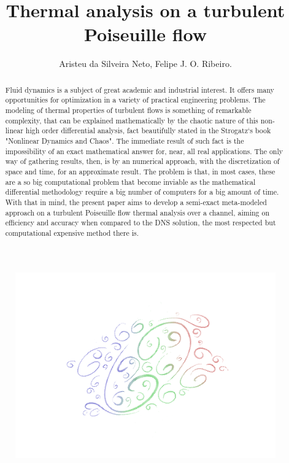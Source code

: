 \documentclass[10pt]{article} %
\title{ \loll Thermal analysis on a turbulent Poiseuille flow}
\author{Aristeu da Silveira Neto,  Felipe J. O. Ribeiro.}
\begin{document}
\maketitle

\begin{figure}[h!]
	\centering
	\includegraphics[angle=0, trim={0 1cm 0 1cm},scale=0.70]{turbulence}
	\label{turbulence}
\end{figure}

\begin{abstract}
	\noindent Fluid dynamics is a subject of great academic and industrial interest. It offers many opportunities for optimization in a variety of practical engineering problems. The modeling of thermal properties of turbulent flows is something of remarkable complexity, that can be explained mathematically by the chaotic nature of this non-linear high order differential analysis, fact beautifully stated in the Strogatz`s book "Nonlinear Dynamics and Chaos". The immediate result of such fact is the impossibility of an exact mathematical answer for, near, all real applications. The only way of gathering results, then, is by an numerical approach, with the discretization of space and time, for an approximate result. The problem is that, in most cases, these are a so big computational problem that become inviable as the mathematical differential methodology require a big number of computers for a big amount of time. With that in mind, the present paper aims to develop a semi-exact meta-modeled approach on a turbulent Poiseuille flow thermal analysis over a channel, aiming on efficiency and accuracy when compared to the DNS solution, the most respected but computational expensive method there is. 
\end{abstract}
\end{document}
